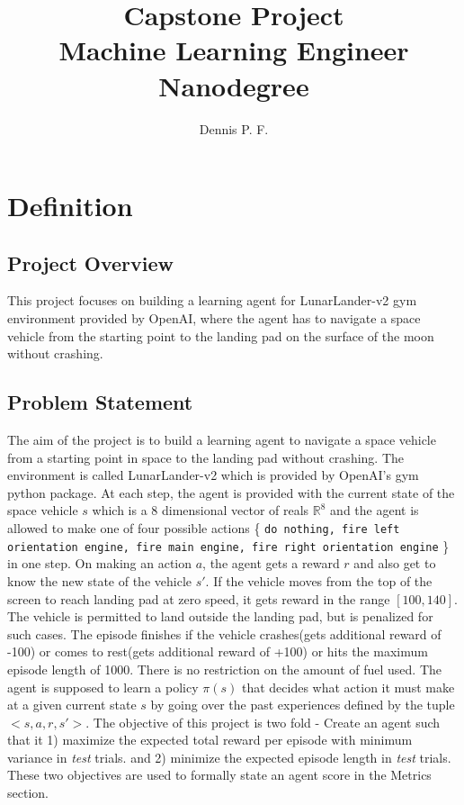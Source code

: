 \documentclass{article}
\begin{document}
\title{Capstone Project \\ {\large Machine Learning Engineer Nanodegree}}
\author{Dennis P. F.}
\maketitle
\pagestyle{empty}
\section{Definition}
\subsection*{Project Overview}
This project focuses on building a learning agent for LunarLander-v2 gym environment provided by OpenAI\cite{challenge}, where the agent has to navigate a space vehicle from the starting point to the landing pad on the surface of the moon without crashing.
\subsection*{Problem Statement}
The aim of the project is to build a learning agent to navigate a space vehicle from a starting point in space to the landing pad without crashing. The environment is called LunarLander-v2 which is provided by OpenAI's gym python package. At each step, the agent is provided with the current state of the space vehicle $s$ which is a 8 dimensional vector of reals $\mathbb{R}^8$ and the agent is allowed to make one of four possible actions \{ \texttt{do nothing, fire left orientation engine, fire main engine, fire right orientation engine} \} in one step. On making an action $a$, the agent gets a reward $r$ and also get to know the new state of the vehicle $s'$. If the vehicle moves from the top of the screen to reach landing pad at zero speed, it gets reward in the range $[100, 140]$. The vehicle is permitted to land outside the landing pad, but is penalized for such cases. The episode finishes if the vehicle crashes(gets additional reward of -100) or comes to rest(gets additional reward of +100) or hits the maximum episode length of 1000. There is no restriction on the amount of fuel used. The agent is supposed to learn a policy $\pi(s)$ that decides what action it must make at a given current state $s$ by going over the past experiences defined by the tuple $<s, a, r, s'>$.  The objective of this project is two fold - Create an agent such that it 1) maximize the expected total reward per episode with minimum variance in \textit{test} trials. and 2) minimize the expected episode length in \textit{test} trials. These two objectives are used to formally state an agent score in the Metrics section.
\end{document}
